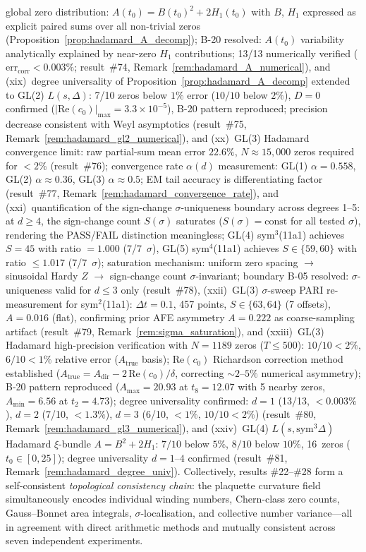 \documentclass[11pt, a4paper]{article}
\theoremstyle{definition}
\theoremstyle{plain}
\begin{document}
global zero distribution: $A(t_0) = B(t_0)^2 + 2H_1(t_0)$ with $B$, $H_1$ expressed as explicit paired sums over all non-trivial zeros (Proposition~\ref{prop:hadamard_A_decomp}); B-20 resolved: $A(t_0)$ variability analytically explained by near-zero $H_1$ contributions; 13/13 numerically verified ($\mathrm{err}_{\mathrm{corr}}{<}0.003\%$; result~\#74, Remark~\ref{rem:hadamard_A_numerical}), and (xix)~degree universality of Proposition~\ref{prop:hadamard_A_decomp} extended to GL(2) $L(s,\Delta)$: 7/10 zeros below $1\%$ error ($10/10$ below $2\%$), $D{=}0$ confirmed ($|\mathrm{Re}(c_0)|_{\mathrm{max}} = 3.3\times10^{-5}$), B-20 pattern reproduced; precision decrease consistent with Weyl asymptotics (result~\#75, Remark~\ref{rem:hadamard_gl2_numerical}), and (xx)~GL(3) Hadamard convergence limit: raw partial-sum mean error $22.6\%$, $N{\approx}15{,}000$ zeros required for ${<}2\%$ (result~\#76); convergence rate $\alpha(d)$ measurement: GL(1) $\alpha{=}0.558$, GL(2) $\alpha{\approx}0.36$, GL(3) $\alpha{\approx}0.5$; EM tail accuracy is differentiating factor (result~\#77, Remark~\ref{rem:hadamard_convergence_rate}), and (xxi)~quantification of the sign-change $\sigma$-uniqueness boundary across degrees 1--5: at $d \geq 4$, the sign-change count $S(\sigma)$ saturates ($S(\sigma) = \text{const}$ for all tested $\sigma$), rendering the PASS/FAIL distinction meaningless; GL(4) sym$^3$(11a1) achieves $S = 45$ with ratio $= 1.000$ (7/7~$\sigma$), GL(5) sym$^4$(11a1) achieves $S \in \{59,60\}$ with ratio $\leq 1.017$ (7/7~$\sigma$); saturation mechanism: uniform zero spacing $\to$ sinusoidal Hardy $Z$ $\to$ sign-change count $\sigma$-invariant; boundary B-05 resolved: $\sigma$-uniqueness valid for $d \leq 3$ only (result~\#78), (xxii)~GL(3) $\sigma$-sweep PARI re-measurement for sym$^2$(11a1): $\Delta t{=}0.1$, 457 points, $S{\in}\{63,64\}$ (7 offsets), $A{=}0.016$ (flat), confirming prior AFE asymmetry $A{=}0.222$ as coarse-sampling artifact (result~\#79, Remark~\ref{rem:sigma_saturation}), and (xxiii)~GL(3) Hadamard high-precision verification with $N{=}1189$ zeros ($T{\leq}500$): $10/10{<}2\%$, $6/10{<}1\%$ relative error ($A_{\text{true}}$ basis); Re$(c_0)$ Richardson correction method established ($A_{\text{true}} = A_{\text{dir}} - 2\,\text{Re}(c_0)/\delta$, correcting $\sim 2$--$5\%$ numerical asymmetry); B-20 pattern reproduced ($A_{\max}{=}20.93$ at $t_8{=}12.07$ with 5 nearby zeros, $A_{\min}{=}6.56$ at $t_2{=}4.73$); degree universality confirmed: $d{=}1$ (13/13, $<0.003\%$), $d{=}2$ (7/10, $<1.3\%$), $d{=}3$ (6/10, $<1\%$, $10/10{<}2\%$) (result~\#80, Remark~\ref{rem:hadamard_gl3_numerical}), and (xxiv)~GL(4) $L(s,\mathrm{sym}^3\Delta)$ Hadamard $\xi$-bundle $A{=}B^2{+}2H_1$: $7/10$ below $5\%$, $8/10$ below $10\%$, 16~zeros ($t_0 \in [0,25]$); degree universality $d{=}1$--$4$ confirmed (result~\#81, Remark~\ref{rem:hadamard_degree_univ}).  Collectively, results \#22--\#28 form a self-consistent
\emph{topological consistency chain}: the plaquette curvature field
simultaneously encodes individual winding numbers, Chern-class
zero counts, Gauss--Bonnet area integrals, $\sigma$-localisation, and
collective number variance---all in agreement with direct arithmetic
methods and mutually consistent across seven independent experiments.
\end{document}
